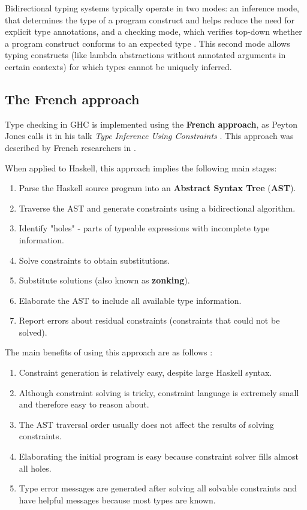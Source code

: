 Bidirectional typing systems typically operate in two modes: an inference mode, that determines the type of a program construct and helps reduce the need for explicit type annotations, and a checking mode, which verifies top-down whether a program construct conforms to an expected type \cite{dunfield-bidirectional-2020}. This second mode allows typing constructs (like lambda abstractions without annotated arguments in certain contexts) for which types cannot be uniquely inferred.

\subsection{The French approach}

Type checking in GHC is implemented using the \textbf{French approach}, as Peyton Jones calls it in his talk \textit{Type Inference Using Constraints} \cite{wits-type-inference-using-constraints}. This approach was described by French researchers \citeauthor{essence-of-ml-type-inference} in \cite{essence-of-ml-type-inference}.

When applied to Haskell, this approach implies the following main stages:

\begin{enumerate}
    \item Parse the Haskell source program into an \textbf{Abstract Syntax Tree} (\textbf{AST}).
    \item Traverse the AST and generate constraints using a bidirectional algorithm.
    \item Identify "holes" - parts of typeable expressions with incomplete type information.
    \item Solve constraints to obtain substitutions.
    \item Substitute solutions (also known as \textbf{zonking}).
    \item Elaborate the AST to include all available type information.
    \item Report errors about residual constraints (constraints that could not be solved).
\end{enumerate}

The main benefits of using this approach are as follows \cite{wits-type-inference-using-constraints}:

\begin{enumerate}
    \item Constraint generation is relatively easy, despite large Haskell syntax.
    \item Although constraint solving is tricky, constraint language is extremely small and therefore easy to reason about.
    \item The AST traversal order usually does not affect the results of solving constraints.
    \item Elaborating the initial program is easy because constraint solver fills almost all holes.
    \item Type error messages are generated after solving all solvable constraints and have helpful messages because most types are known.
\end{enumerate}

